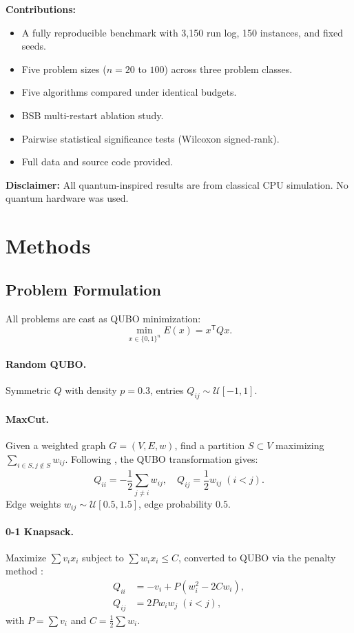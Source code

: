\documentclass[10pt,twocolumn]{article}
\begin{document}
\textbf{Contributions:}
\begin{itemize}
\item A fully reproducible benchmark with 3,150 run log, 150 instances, and fixed seeds.
\item Five problem sizes ($n=20$ to $100$) across three problem classes.
\item Five algorithms compared under identical budgets.
\item BSB multi-restart ablation study.
\item Pairwise statistical significance tests (Wilcoxon signed-rank).
\item Full data and source code provided.
\end{itemize}

\textbf{Disclaimer:} All quantum-inspired results are from classical CPU simulation. No quantum hardware was used.

\section{Methods}
\label{sec:methods}

\subsection{Problem Formulation}
All problems are cast as QUBO minimization:
\begin{equation}
\min_{x\in\{0,1\}^n} E(x) = x^{\mathsf{T}} Q x .
\end{equation}

\paragraph{Random QUBO.}
Symmetric $Q$ with density $p=0.3$, entries $Q_{ij} \sim \mathcal{U}[-1,1]$.

\paragraph{MaxCut.}
Given a weighted graph $G=(V,E,w)$, find a partition $S\subset V$ maximizing $\sum_{i\in S,j\notin S} w_{ij}$. Following \cite{lucas2014}, the QUBO transformation gives:
\begin{equation}
Q_{ii} = -\frac12\sum_{j\neq i} w_{ij}, \quad
Q_{ij} = \frac12 w_{ij}\;(i<j).
\end{equation}
Edge weights $w_{ij}\sim\mathcal{U}[0.5,1.5]$, edge probability $0.5$.

\paragraph{0-1 Knapsack.}
Maximize $\sum v_i x_i$ subject to $\sum w_i x_i \leq C$, converted to QUBO via the penalty method \cite{gange2022}:
\begin{align}
Q_{ii} &= -v_i + P(w_i^2 - 2C w_i), \\
Q_{ij} &= 2P w_i w_j \;(i<j),
\end{align}
with $P=\sum v_i$ and $C=\frac12\sum w_i$.
\end{document}

